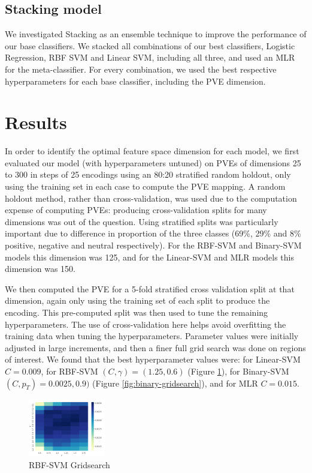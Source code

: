 \documentclass[11pt]{article}
\begin{document}
\subsection{Stacking model}
We investigated Stacking as an ensemble technique to improve the performance of our base classifiers. We stacked all combinations of our best classifiers, Logistic Regression, RBF SVM and Linear SVM, including all three, and used an MLR for the meta-classifier. For every combination, we used the best respective hyperparameters for each base classifier, including the PVE dimension.

\section{Results}
In order to identify the optimal feature space dimension for each model, we first evaluated our model (with hyperparameters untuned) on PVEs of dimensions 25 to 300 in steps of 25 encodings using an 80:20 stratified random holdout, only using the training set in each case to compute the PVE mapping. A random holdout method, rather than cross-validation, was used due to the computation expense of computing PVEs: producing cross-validation splits for many dimensions was out of the question. Using stratified splits was particularly important due to difference in proportion of the three classes (69\%, 29\% and 8\% positive, negative and neutral respectively). For the RBF-SVM and Binary-SVM models this dimension was 125, and for the Linear-SVM and MLR models this dimension was 150.

We then computed the PVE for a 5-fold stratified cross validation split at that dimension, again only using the training set of each split to produce the encoding. This pre-computed split was then used to tune the remaining hyperparameters. The use of cross-validation here helps avoid overfitting the training data when tuning the hyperparameters. Parameter values were initially adjusted in large increments, and then a finer full grid search was done on regions of interest. We found that the best hyperparameter values were: for Linear-SVM $C = 0.009$, for RBF-SVM $(C, \gamma) = (1.25, 0.6)$ (Figure \ref{fig:rbf-gridsearch}), for Binary-SVM $(C, p_T) = 0.0025, 0.9)$ (Figure \ref{fig:binary-gridsearch}), and for MLR $C = 0.015$.
\begin{figure}
	\centering
	\includegraphics[width = 0.3\textwidth]{fig-rbf-gridsearch.png}
	\caption{RBF-SVM Gridsearch}
	\label{fig:rbf-gridsearch}
\end{figure}
\end{document}
